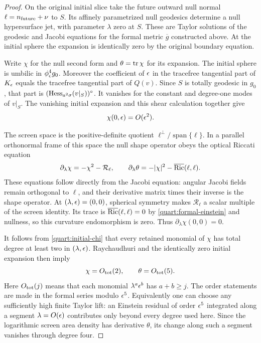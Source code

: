 \begin{proof}
On the original initial slice take the future outward null normal
\(\ell=n_{\rm future}+\nu\) to \(S\).  Its affinely parametrized
null geodesics determine a null hypersurface jet, with parameter
\(\lambda\) zero at \(S\).  These are Taylor solutions of the
geodesic and Jacobi equations for the formal metric
\(\overline g\) constructed above.  At the initial sphere the
expansion is identically zero by the original boundary equation.

Write \(\chi\) for the null second form and \(\theta=\operatorname{tr}\chi\)
for its expansion.  The initial sphere is umbilic in
\(\phi_\epsilon^4g_0\). Moreover the coefficient of \(\epsilon\) in the
tracefree tangential part of \(K_\epsilon\) equals the tracefree tangential
part of \(Q(v)\).
Since \(S\) is totally geodesic in \(g_0\), that part is
\((\operatorname{Hess}_{a^2\sigma}(v|_S))^{\circ}\).  It vanishes for the constant
and degree-one modes of \(v|_S\).  The vanishing initial expansion
and this shear calculation together give
\begin{equation}
 \chi(0,\epsilon)=O(\epsilon^2).
 \label{quart:initial-chi}
\end{equation}

The screen space is the positive-definite quotient
\(\ell^\perp/\operatorname{span}\{\ell\}\). In a parallel orthonormal
frame of this space the null shape operator obeys the optical Riccati
equation
\[
 \partial_\lambda\chi=-\chi^2-\mathcal R_\ell,
 \qquad
 \partial_\lambda\theta
       =-|\chi|^2-\overline{\operatorname{Ric}}(\ell,\ell).
\]
These equations follow directly from the Jacobi equation: angular
Jacobi fields remain orthogonal to \(\ell\), and their derivative
matrix times their inverse is the shape operator.  At
\((\lambda,\epsilon)=(0,0)\), spherical symmetry makes
\(\mathcal R_\ell\) a scalar multiple of the screen identity.
Its trace is \(\overline{\operatorname{Ric}}(\ell,\ell)=0\) by
\eqref{quart:formal-einstein} and nullness, so this curvature
endomorphism is zero.  Thus
\(\partial_\lambda\chi(0,0)=0\).

It follows from \eqref{quart:initial-chi} that every retained monomial
of \(\chi\) has total degree at least two in \((\lambda,\epsilon)\).
Raychaudhuri and the identically zero initial expansion then imply
\begin{equation}
 \chi=O_{\rm tot}(2),\qquad
 \theta=O_{\rm tot}(5).
 \label{quart:optical-orders}
\end{equation}
Here $O_{\rm tot}(j)$ means that each monomial $\lambda^a\epsilon^b$
has $a+b\geq j$. The order statements are made in the formal series modulo
\(\epsilon^5\).  Equivalently one can choose any sufficiently high
finite Taylor lift: an Einstein residual of order \(\epsilon^5\)
integrated along a segment \(\lambda=O(\epsilon)\) contributes only
beyond every degree used here.  Since the logarithmic screen area
density has derivative \(\theta\), its change along such a segment
vanishes through degree four.


\end{proof}
